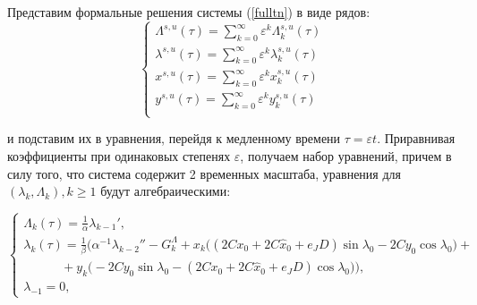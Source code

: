     Представим формальные решения системы (\ref{fulltn}) в виде рядов:
    \begin{equation}
    \begin{cases}
\Lambda^{s,u}(\tau) = \sum_{k=0}^\infty \varepsilon^k \Lambda^{s,u}_k(\tau)\\
\lambda^{s,u}(\tau) = \sum_{k=0}^\infty \varepsilon^k \lambda^{s,u}_k(\tau)\\
x^{s,u}(\tau) =       \sum_{k=0}^\infty \varepsilon^k x^{s,u}_k(\tau)\\
y^{s,u}(\tau) =       \sum_{k=0}^\infty \varepsilon^k y^{s,u}_k(\tau)\\
\end{cases}
    \label{predst}
\end{equation}


    и подставим их в уравнения, перейдя к медленному времени $\tau=\varepsilon t$.
    Приравнивая коэффициенты при одинаковых степенях $\varepsilon$, получаем набор уравнений, причем в силу того, что система содержит 2 временных масштаба, уравнения для $(\lambda_k, \Lambda_k), k \ge 1$ будут алгебраическими:

\begin{equation}
    \begin{cases}
        \Lambda_k(\tau) = \frac{1}{\alpha} \lambda_{k-1}', \\
        
        \lambda_k(\tau) = \frac1\beta \Big( \alpha^{-1} \lambda_{k-2}'' - G_k^\Lambda + x_k \big( (2Cx_0+2C \hat x_0+e_JD) \sin\lambda_0 - 2Cy_0 \cos\lambda_0 \big) + \\
        
        \quad \quad \quad +y_k \big( -2Cy_0 \sin\lambda_0 - (2Cx_0+2C \hat x_0+e_JD) \cos\lambda_0 \big) \Big),\\
        \lambda_{-1}=0,
    \end{cases}
\end{equation}

